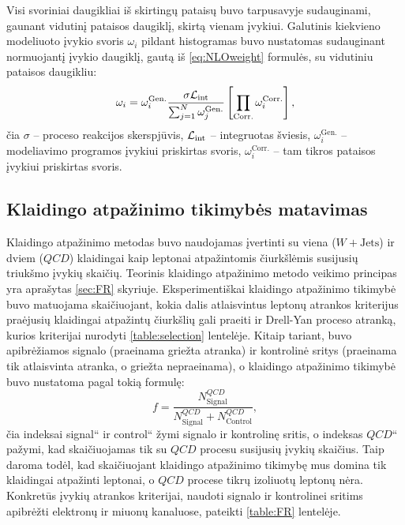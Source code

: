 \documentclass[a4paper, 12pt, oneside]{article}
\newcommand{\WJets}{W\! +\!\mathrm{Jets}}
\newcommand{\ltq}[1]{{\quotedblbase{}#1\textquotedblleft{}}}
\newcommand{\Lumi}{{\cal L}_\mathrm{int}}
\newcommand{\QCD}{QC\! D}
\newlength\q
\begin{document}
Visi svoriniai daugikliai iš skirtingų pataisų buvo tarpusavyje sudauginami, gaunant vidutinį pataisos daugiklį, skirtą vienam įvykiui.
Galutinis kiekvieno modeliuoto įvykio svoris $\omega_i$ pildant histogramas buvo nustatomas sudauginant normuojantį įvykio daugiklį,
gautą iš \eqref{eq:NLOweight} formulės, su vidutiniu pataisos daugikliu:
\begin{equation}
\label{eq:weightCorr}
	\omega_i = \omega_{i}^{\mathrm{Gen.}} \frac{ \sigma\Lumi }{ \sum_{j=1}^{N}\omega_{j}^{\mathrm{Gen.}} }
			   \left[ \prod_{\mathrm{Corr.}} \omega_i^{\mathrm{Corr.}} \right] ,
\end{equation}
čia $\sigma$ -- proceso reakcijos skerspjūvis, $\Lumi$ -- integruotas šviesis, $\omega_{i}^{\mathrm{Gen.}}$ -- modeliavimo
programos įvykiui priskirtas svoris, $\omega_i^{\mathrm{Corr.}}$ -- tam tikros pataisos įvykiui priskirtas svoris.


\subsection{Klaidingo atpažinimo tikimybės matavimas}\label{sec:FRmeasure}
Klaidingo atpažinimo metodas buvo naudojamas įvertinti su viena ($\WJets$) ir dviem ($\QCD$) klaidingai kaip leptonai
atpažintomis čiurkšlėmis susijusių triukšmo įvykių skaičių.
Teorinis klaidingo atpažinimo metodo veikimo principas yra aprašytas \ref{sec:FR} skyriuje.
Eksperimentiškai klaidingo atpažinimo tikimybė buvo matuojama skaičiuojant, kokia dalis atlaisvintus leptonų atrankos
kriterijus praėjusių klaidingai atpažintų čiurkšlių gali praeiti ir Drell-Yan proceso atranką, kurios kriterijai nurodyti
\ref{table:selection} lentelėje.
Kitaip tariant, buvo apibrėžiamos signalo (praeinama griežta atranka) ir kontrolinė sritys (praeinama tik atlaisvinta
atranka, o griežta nepraeinama), o klaidingo atpažinimo tikimybė buvo nustatoma pagal tokią formulę:
\begin{equation}
	\label{eq:FRexp}
	f = \frac{N_{\mathrm{Signal}}^{\QCD}}{N_{\mathrm{Signal}}^{\QCD}+N_{\mathrm{Control}}^{\QCD}},
\end{equation}
čia indeksai \ltq{signal} ir \ltq{control} žymi signalo ir kontrolinę sritis, o indeksas \ltq{$\QCD$} pažymi, kad
skaičiuojamas tik su $\QCD$ procesu susijusių įvykių skaičius.
Taip daroma todėl, kad skaičiuojant klaidingo atpažinimo tikimybę mus domina tik klaidingai atpažinti leptonai,
o $\QCD$ procese tikrų izoliuotų leptonų nėra.
Konkretūs įvykių atrankos kriterijai, naudoti signalo ir kontrolinei sritims apibrėžti elektronų ir miuonų kanaluose,
pateikti \ref{table:FR} lentelėje.
\end{document}

